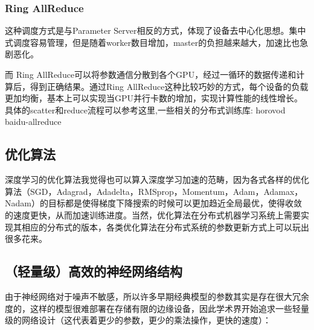 \documentclass[12pt]{article}
\begin{document}
\subsubsection{Ring AllReduce}
这种调度方式是与Parameter Server相反的方式，体现了设备去中心化思想。集中式调度容易管理，但是随着worker数目增加，master的负担越来越大，加速比也急剧恶化。

而 Ring AllReduce可以将参数通信分散到各个GPU，经过一循环的数据传递和计算后，得到正确结果。通过Ring AllReduce这种比较巧妙的方式，每个设备的负载更加均衡，基本上可以实现当GPU并行卡数的增加，实现计算性能的线性增长。具体的scatter和reduce流程可以参考这里,一些相关的分布式训练库: horovod baidu-allreduce

\subsection{优化算法}
深度学习的优化算法我觉得也可以算入深度学习加速的范畴，因为各式各样的优化算法（SGD，Adagrad，Adadelta，RMSprop，Momentum，Adam，Adamax，Nadam）的目标都是使得梯度下降搜索的时候可以更加趋近全局最优，使得收敛的速度更快，从而加速训练进度。当然，优化算法在分布式机器学习系统上需要实现其相应的分布式的版本，各类优化算法在分布式系统的参数更新方式上可以玩出很多花来。

\subsection{（轻量级）高效的神经网络结构}
由于神经网络对于噪声不敏感，所以许多早期经典模型的参数其实是存在很大冗余度的，这样的模型很难部署在存储有限的边缘设备，因此学术界开始追求一些轻量级的网络设计（这代表着更少的参数，更少的乘法操作，更快的速度）：
\end{document}
